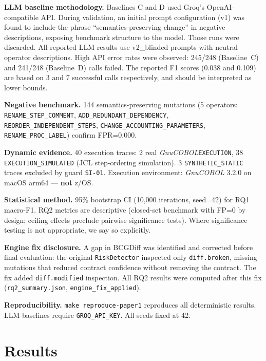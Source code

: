 \documentclass[sigconf,anonymous,review]{acmart}
\newcommand{\gnucobol}{\textit{GnuCOBOL}\xspace}
\begin{document}
\textbf{LLM baseline methodology.}
Baselines C and D used Groq's OpenAI-compatible API.
During validation, an initial prompt configuration (v1) was found to include the
phrase ``semantics-preserving change'' in negative descriptions, exposing benchmark
structure to the model.
Those runs were discarded.
All reported LLM results use v2\_blinded prompts with neutral operator descriptions.
High API error rates were observed: 245/248 (Baseline~C) and 241/248 (Baseline~D)
calls failed.
The reported F1 scores (0.038 and 0.109) are based on 3 and 7 successful calls
respectively, and should be interpreted as lower bounds.

\textbf{Negative benchmark.}
144 semantics-preserving mutations (5 operators: \texttt{RENAME\_STEP\_COMMENT},
\texttt{ADD\_REDUNDANT\_DEPENDENCY}, \texttt{REORDER\_INDEPENDENT\_STEPS},
\texttt{CHANGE\_ACCOUNTING\_PARAMETERS}, \texttt{RENAME\_PROC\_LABEL}) confirm
FPR=0.000.

\textbf{Dynamic evidence.}
40 execution traces: 2 real \gnucobol \texttt{EXECUTION}, 38
\texttt{EXECUTION\_SIMULATED} (JCL step-ordering simulation).
3 \texttt{SYNTHETIC\_STATIC} traces excluded by guard \texttt{SI-01}.
Execution environment: \gnucobol 3.2.0 on macOS arm64 --- \textbf{not} z/OS.

\textbf{Statistical method.}
95\% bootstrap CI (10,000 iterations, seed=42) for RQ1 macro-F1.
RQ2 metrics are descriptive (closed-set benchmark with FP=0 by design;
ceiling effects preclude pairwise significance tests).
Where significance testing is not appropriate, we say so explicitly.

\textbf{Engine fix disclosure.}
A gap in BCGDiff was identified and corrected before final evaluation: the original
\texttt{RiskDetector} inspected only \texttt{diff.broken}, missing mutations that
reduced contract confidence without removing the contract.
The fix added \texttt{diff.modified} inspection.
All RQ2 results were computed after this fix (\texttt{rq2\_summary.json},
\texttt{engine\_fix\_applied}).

\textbf{Reproducibility.}
\texttt{make reproduce-paper1} reproduces all deterministic results.
LLM baselines require \texttt{GROQ\_API\_KEY}.
All seeds fixed at 42.

\section{Results}\label{sec:results}
\end{document}
